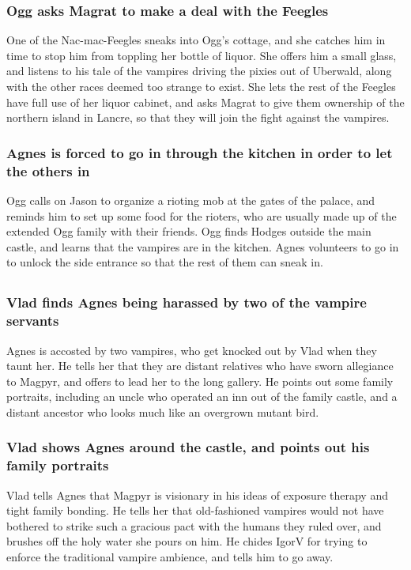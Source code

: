 \subsubsection{\Gls{Ogg} asks \Gls{Magrat} to make a deal with the Feegles}
One of the Nac-mac-Feegles sneaks into \Gls{Ogg}'s cottage, and she catches him in time to stop him
from toppling her bottle of liquor. She offers him a small glass, and listens to his tale of the
vampires driving the pixies out of Uberwald, along with the other races deemed too strange to exist.
She lets the rest of the Feegles have full use of her liquor cabinet, and asks \Gls{Magrat} to give
them ownership of the northern island in Lancre, so that they will join the fight against the
vampires.

\subsubsection{\Gls{Agnes} is forced to go in through the kitchen in order to let the others in}
\Gls{Ogg} calls on \Gls{Jason} to organize a rioting mob at the gates of the palace, and reminds
him to set up some food for the rioters, who are usually made up of the extended Ogg family with
their friends. \Gls{Ogg} finds \Gls{Hodges} outside the main castle, and learns that the vampires
are in the kitchen. \Gls{Agnes} volunteers to go in to unlock the side entrance so that the rest of
them can sneak in.

\subsection{}
\subsubsection{\Gls{Vlad} finds \Gls{Agnes} being harassed by two of the vampire servants}
\Gls{Agnes} is accosted by two vampires, who get knocked out by \Gls{Vlad} when they taunt her.
He tells her that they are distant relatives who have sworn allegiance to \Gls{Magpyr}, and offers
to lead her to the long gallery. He points out some family portraits, including an uncle who
operated an inn out of the family castle, and a distant ancestor who looks much like an overgrown
mutant bird.

\subsubsection{\Gls{Vlad} shows \Gls{Agnes} around the castle, and points out his family portraits}
\Gls{Vlad} tells \Gls{Agnes} that \Gls{Magpyr} is visionary in his ideas of exposure therapy and
tight family bonding. He tells her that old-fashioned vampires would not have bothered to strike
such a gracious pact with the humans they ruled over, and brushes off the holy water she pours on
him. He chides \Gls{IgorV} for trying to enforce the traditional vampire ambience, and tells him
to go away.

